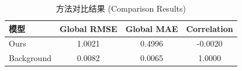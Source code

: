 \begin{table}[t]
\centering
\caption{方法对比结果 (Comparison Results)}
\label{tab:comparison}
\begin{tabular}{lccc}
\hline
模型 & Global RMSE & Global MAE & Correlation \\
\hline
Ours & 1.0021 & 0.4996 & -0.0020 \\
Background & 0.0082 & 0.0065 & 1.0000 \\
\hline
\end{tabular}
\end{table}
